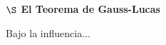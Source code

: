 


\begin{center}
    {\large \textbf{ $\S$ El Teorema de Gauss-Lucas}}
\end{center}

{\fontsize{7}{5}
Bajo la influencia... 
}

